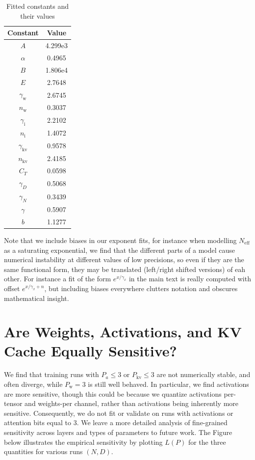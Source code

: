 \documentclass[11pt]{article}
\begin{document}

\begin{table}[h!]
\centering
\begin{tabular}{|c|c|}
\hline
\textbf{Constant} & \textbf{Value} \\
\hline
$A$ & 4.299e3 \\
$\alpha$ & 0.4965 \\
$B$ & 1.806e4 \\
$E$ & 2.7648 \\
$\gamma_\text{w}$ & 2.6745 \\
$n_\text{w}$ & 0.3037 \\
$\gamma_\text{i}$ & 2.2102 \\
$n_\text{i}$ & 1.4072 \\
$\gamma_\text{kv}$ & 0.9578 \\
$n_\text{kv}$ & 2.4185 \\
$C_T$ & 0.0598 \\
$\gamma_D$ & 0.5068 \\
$\gamma_N$ & 0.3439 \\
$\gamma$ & 0.5907 \\
$b$ & 1.1277 \\
\hline
\end{tabular}
\caption{Fitted constants and their values}
\end{table}

Note that we include biases in our exponent fits, for instance when modelling $N_\text{eff}$ as a saturating exponential, we find that the different parts of a model cause numerical instability at different values of low precisions, so even if they are the same functional form, they may be translated (left/right shifted versions) of eah other. For instance a fit of the form $e^{x/\gamma_x}$ in the main text is really computed with offset $e^{x/\gamma_x + n}$, but including biases everywhere clutters notation and obscures mathematical insight. 


\section{Are Weights, Activations, and KV Cache Equally Sensitive?}
\label{appdx: diff-param-types}

We find that training runs with $P_a \le 3$ or $P_\text{kv} \le 3$ are not numerically stable, and often diverge, while $P_\text{w} = 3$ is still well behaved. In particular, we find activations are more sensitive, though this could be because we quantize activations per-tensor and weights-per channel, rather than activations being inherently more sensitive. Consequently, we do not fit or validate on runs with activations or attention bits equal to 3. We leave a more detailed analysis of fine-grained sensitivity across layers and types of parameters to future work. The Figure below illustrates the empirical sensitivity by plotting $L(P)$ for the three quantities for various runs $(N, D)$. 
\end{document}
